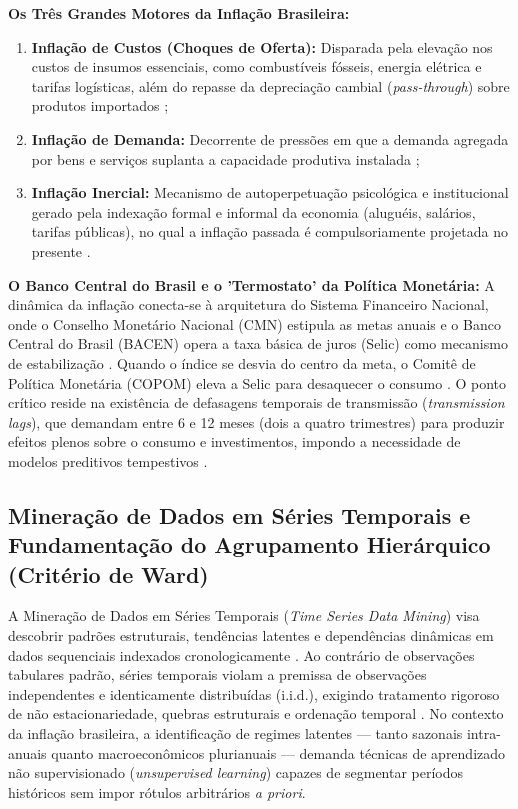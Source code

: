 \documentclass[10pt,twoside]{article}
\begin{document}
\textbf{Os Três Grandes Motores da Inflação Brasileira:}
\begin{enumerate}[leftmargin=1.5em]
    \item \textbf{Inflação de Custos (Choques de Oferta):} Disparada pela elevação nos custos de insumos essenciais, como combustíveis fósseis, energia elétrica e tarifas logísticas, além do repasse da depreciação cambial (\textit{pass-through}) sobre produtos importados \cite{ref4, ref13};
    \item \textbf{Inflação de Demanda:} Decorrente de pressões em que a demanda agregada por bens e serviços suplanta a capacidade produtiva instalada \cite{ref4, ref13};
    \item \textbf{Inflação Inercial:} Mecanismo de autoperpetuação psicológica e institucional gerado pela indexação formal e informal da economia (aluguéis, salários, tarifas públicas), no qual a inflação passada é compulsoriamente projetada no presente \cite{ref5, ref16}.
\end{enumerate}

\textbf{O Banco Central do Brasil e o 'Termostato' da Política Monetária:} A dinâmica da inflação conecta-se à arquitetura do Sistema Financeiro Nacional, onde o Conselho Monetário Nacional (CMN) estipula as metas anuais e o Banco Central do Brasil (BACEN) opera a taxa básica de juros (Selic) como mecanismo de estabilização \cite{ref2, ref3}. Quando o índice se desvia do centro da meta, o Comitê de Política Monetária (COPOM) eleva a Selic para desaquecer o consumo \cite{ref3, ref17}. O ponto crítico reside na existência de defasagens temporais de transmissão (\textit{transmission lags}), que demandam entre 6 e 12 meses (dois a quatro trimestres) para produzir efeitos plenos sobre o consumo e investimentos, impondo a necessidade de modelos preditivos tempestivos \cite{ref3, ref17}.

\subsection{Mineração de Dados em Séries Temporais e Fundamentação do Agrupamento Hierárquico (Critério de Ward)}
A Mineração de Dados em Séries Temporais (\textit{Time Series Data Mining}) visa descobrir padrões estruturais, tendências latentes e dependências dinâmicas em dados sequenciais indexados cronologicamente \cite{ref7, ref9}. Ao contrário de observações tabulares padrão, séries temporais violam a premissa de observações independentes e identicamente distribuídas (i.i.d.), exigindo tratamento rigoroso de não estacionariedade, quebras estruturais e ordenação temporal \cite{ref7, ref9}. No contexto da inflação brasileira, a identificação de regimes latentes — tanto sazonais intra-anuais quanto macroeconômicos plurianuais — demanda técnicas de aprendizado não supervisionado (\textit{unsupervised learning}) capazes de segmentar períodos históricos sem impor rótulos arbitrários \textit{a priori}.
\end{document}
